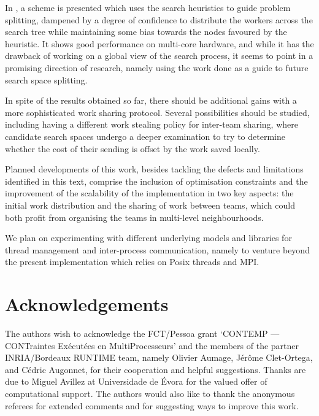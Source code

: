 \documentclass{llncs}
\begin{document}
In \cite{confid:cp09}, a scheme is presented which uses the search
heuristics to guide problem splitting, dampened by a degree of
confidence to distribute the workers across the search tree while
maintaining some bias towards the nodes favoured by the heuristic. It
shows good performance on multi-core hardware, and while it has the
drawback of working on a global view of the search process, it seems
to point in a promising direction of research, namely using the work
done as a guide to future search space splitting.

In spite of the results obtained so far, there should be additional
gains with a more sophisticated work sharing protocol. Several
possibilities should be studied, including having a different work
stealing policy for inter-team sharing, where candidate search spaces
undergo a deeper examination to try to determine whether the cost of
their sending is offset by the work saved locally.

Planned developments of this work, besides tackling the defects and
limitations identified in this text, comprise the inclusion of
optimisation constraints and the improvement of the scalability of the
implementation in two key aspects: the initial work distribution and
the sharing of work between teams, which could both profit from
organising the teams in multi-level neighbourhoods.

We plan on experimenting with different underlying models and
libraries for thread management and inter-process communication,
namely to venture beyond the present implementation which relies on
Posix threads and MPI.


\section*{Acknowledgements}

The authors wish to acknowledge the FCT/Pessoa grant `CONTEMP ---
CONTraintes Ex\'ecut\'ees en MultiProcesseurs' and the members of the
partner INRIA/Bordeaux RUNTIME team, namely Olivier Aumage, J\'er\^ome
Clet-Ortega, and C\'edric Augonnet, for their cooperation and helpful
suggestions. Thanks are due to Miguel Avillez at Universidade de
\'Evora for the valued offer of computational support. The authors
would also like to thank the anonymous referees for extended comments
and for suggesting ways to improve this work.




\end{document}
